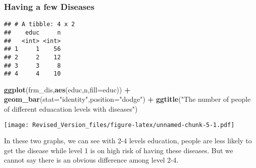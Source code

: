 \documentclass[]{article}
\newenvironment{Shaded}{\begin{snugshade}}{\end{snugshade}}
\newcommand{\KeywordTok}[1]{\textcolor[rgb]{0.13,0.29,0.53}{\textbf{#1}}}
\newcommand{\DataTypeTok}[1]{\textcolor[rgb]{0.13,0.29,0.53}{#1}}
\newcommand{\DecValTok}[1]{\textcolor[rgb]{0.00,0.00,0.81}{#1}}
\newcommand{\StringTok}[1]{\textcolor[rgb]{0.31,0.60,0.02}{#1}}
\newcommand{\OperatorTok}[1]{\textcolor[rgb]{0.81,0.36,0.00}{\textbf{#1}}}
\newcommand{\NormalTok}[1]{#1}
\begin{document}
\subsubsection{Having a few Diseases}\label{having-a-few-diseases}

\begin{Shaded}
\end{Shaded}

\begin{verbatim}
## # A tibble: 4 x 2
##    educ     n
##   <int> <int>
## 1     1    56
## 2     2    12
## 3     3     8
## 4     4    10
\end{verbatim}

\begin{Shaded}
\begin{Highlighting}[]
\KeywordTok{ggplot}\NormalTok{(frm_dis,}\KeywordTok{aes}\NormalTok{(educ,n,}\DataTypeTok{fill=}\NormalTok{educ)) }\OperatorTok{+}
\StringTok{  }\KeywordTok{geom_bar}\NormalTok{(}\DataTypeTok{stat=}\StringTok{"identity"}\NormalTok{,}\DataTypeTok{position=}\StringTok{"dodge"}\NormalTok{) }\OperatorTok{+}
\StringTok{  }\KeywordTok{ggtitle}\NormalTok{(}\StringTok{"The number of people of different eduacation levels with diseases"}\NormalTok{)}
\end{Highlighting}
\end{Shaded}

\texttt{[image: Revised\_Version\_files/figure-latex/unnamed-chunk-5-1.pdf]}

In these two graphs, we can see with 2-4 levels education, people are
less likely to get the disease while level 1 is on high risk of having
these diseases. But we cannot say there is an obvious difference among
level 2-4.
\end{document}
